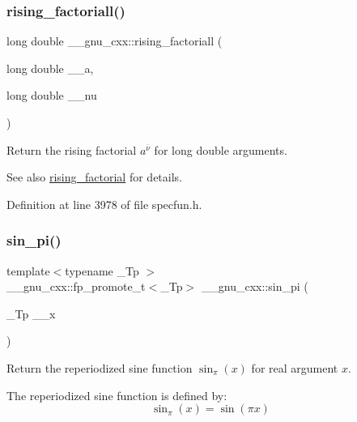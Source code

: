 \subsubsection{\texorpdfstring{rising\+\_\+factoriall()}{rising\_factoriall()}}
{\footnotesize\ttfamily long double \+\_\+\+\_\+gnu\+\_\+cxx\+::rising\+\_\+factoriall (\begin{DoxyParamCaption}\item[{long double}]{\+\_\+\+\_\+a,  }\item[{long double}]{\+\_\+\+\_\+nu }\end{DoxyParamCaption})\hspace{0.3cm}{\ttfamily [inline]}}

Return the rising factorial $ a^{\overline{\nu}} $ for {\ttfamily  long double } arguments.

\begin{DoxySeeAlso}{See also}
\hyperlink{group__gnu__math__spec__func_gae8c36a0e1f60254cf212a3806f7c675c}{rising\+\_\+factorial} for details. 
\end{DoxySeeAlso}


Definition at line 3978 of file specfun.\+h.

\mbox{\label{group__gnu__math__spec__func_ga220f8a9a0477697cff96e84dc911d5f0}} 
\subsubsection{\texorpdfstring{sin\+\_\+pi()}{sin\_pi()}}
{\footnotesize\ttfamily template$<$typename \+\_\+\+Tp $>$ \\
\+\_\+\+\_\+gnu\+\_\+cxx\+::fp\+\_\+promote\+\_\+t$<$\+\_\+\+Tp$>$ \+\_\+\+\_\+gnu\+\_\+cxx\+::sin\+\_\+pi (\begin{DoxyParamCaption}\item[{\+\_\+\+Tp}]{\+\_\+\+\_\+x }\end{DoxyParamCaption})\hspace{0.3cm}{\ttfamily [inline]}}

Return the reperiodized sine function $ \sin_\pi(x) $ for real argument $ x $.

The reperiodized sine function is defined by\+: \[ \sin_\pi(x) = \sin(\pi x) \]


